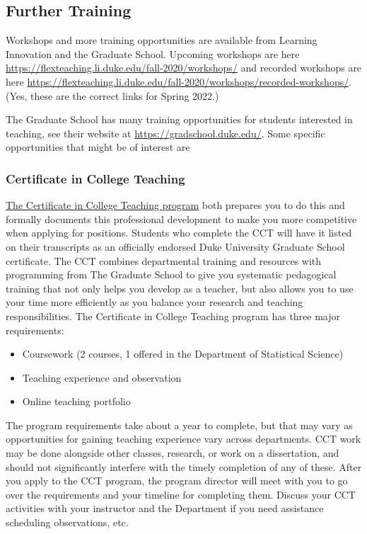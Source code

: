 \documentclass[
]{article}
\providecommand{\tightlist}{%
  \setlength{\itemsep}{0pt}\setlength{\parskip}{0pt}}
\begin{document}
\hypertarget{further-training}{%
\subsection{Further Training}\label{further-training}}

Workshops and more training opportunities are available from Learning Innovation and the Graduate School. Upcoming workshops are here \url{https://flexteaching.li.duke.edu/fall-2020/workshops/} and recorded workshops are here \url{https://flexteaching.li.duke.edu/fall-2020/workshops/recorded-workshops/}. (Yes, these are the correct links for Spring 2022.)

The Graduate School has many training opportunities for students interested in teaching, see their website at \url{https://gradschool.duke.edu/}. Some specific opportunities that might be of interest are

\hypertarget{certificate-in-college-teaching}{%
\subsubsection{Certificate in College Teaching}\label{certificate-in-college-teaching}}

\href{https://gradschool.duke.edu/professional-development/programs/certificate-college-teaching}{The Certificate in College Teaching program} both prepares you to do this and formally documents this professional development to make you more competitive when applying for positions. Students who complete the CCT will have it listed on their transcripts as an officially endorsed Duke University Graduate School certificate. The CCT combines departmental training and resources with programming from The Graduate School to give you systematic pedagogical training that not only helps you develop as a teacher, but also allows you to use your time more efficiently as you balance your research and teaching responsibilities. The Certificate in College Teaching program has three major requirements:

\begin{itemize}
\tightlist
\item
  Coursework (2 courses, 1 offered in the Department of Statistical Science)
\item
  Teaching experience and observation
\item
  Online teaching portfolio
\end{itemize}

The program requirements take about a year to complete, but that may vary as opportunities for gaining teaching experience vary across departments. CCT work may be done alongside other classes, research, or work on a dissertation, and should not significantly interfere with the timely completion of any of these. After you apply to the CCT program, the program director will meet with you to go over the requirements and your timeline for completing them. Discuss your CCT activities with your instructor and the Department if you need assistance scheduling observations, etc.
\end{document}
